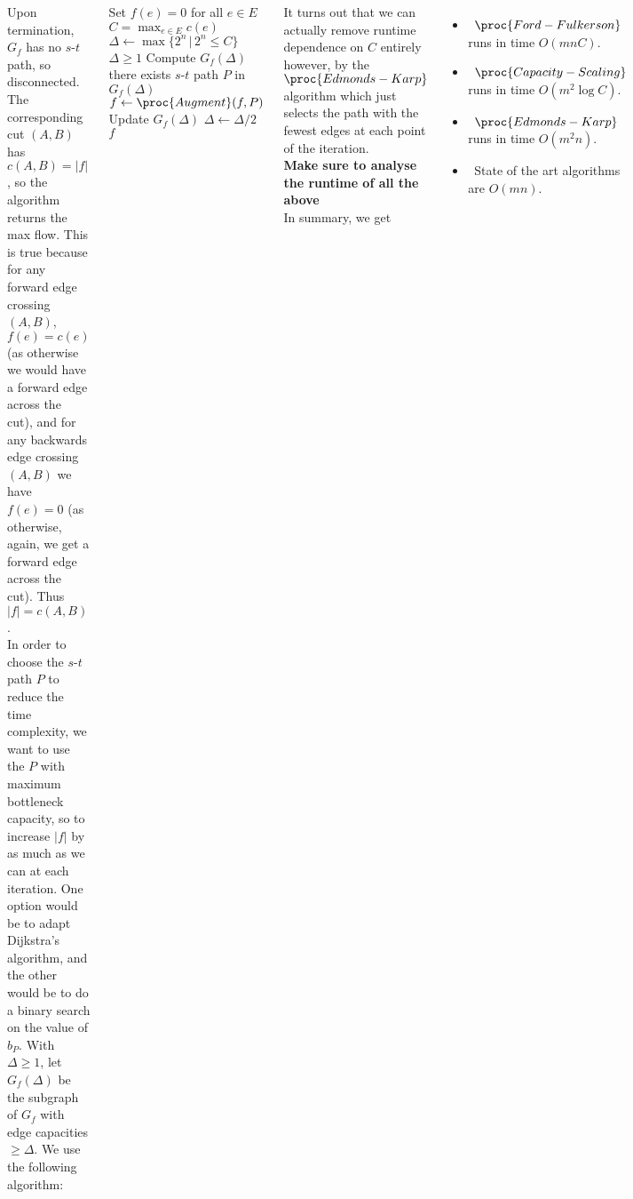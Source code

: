 \documentclass{tikzposter} %
\begin{document}
\begin{columns}
{  Upon termination, $G_{f}$ has no $s$-$t$ path, so disconnected. The corresponding cut $(A,B)$ has $c(A, B) = |f|$, so the algorithm returns the max flow. This is true because for any forward edge crossing $(A,B)$, $f(e) = c(e)$ (as otherwise we would have a forward edge across the cut), and for any backwards edge crossing $(A,B)$ we have $f(e) = 0$ (as otherwise, again, we get a forward edge across the cut). Thus $|f| = c(A,B)$.\\

  In order to choose the $s$-$t$ path $P$ to reduce the time complexity, we want to use the $P$ with maximum bottleneck capacity, so to increase $|f|$ by as much as we can at each iteration. One option would be to adapt Dijkstra's algorithm, and the other would be to do a binary search on the value of $b_{P}$. With $\Delta \ge 1$, let $G_{f}(\Delta)$ be the subgraph of $G_{f}$ with edge capacities $\ge \Delta$. We use the following algorithm:

  \begin{codebox}
  \li Set $f(e) = 0$ for all $e \in E$
  \li $C = \max_{e \in E} c(e)$
  \li $\Delta \gets \max \{2^{n} \,|\, 2^{n} \le C\}$
  \li \While $\Delta \ge 1$ \Do
  \li     Compute $G_{f}(\Delta)$
  \li     \While there exists $s$-$t$ path $P$ in $G_{f}(\Delta)$ \Do
  \li         $f \gets \proc{Augment}(f, P)$
  \li         Update $G_{f}(\Delta)$
          \End
  \li     $\Delta \gets \Delta / 2$
      \End
  \li \Return $f$
  \end{codebox}

  It turns out that we can actually remove runtime dependence on $C$ entirely however, by the $\proc{Edmonds-Karp}$ algorithm which just selects the path with the fewest edges at each point of the iteration.  \\

  \textbf{Make sure to analyse the runtime of all the above} \\

  In summary, we get
  \begin{itemize}
          \item \ $\proc{Ford-Fulkerson}$ runs in time $O(mnC)$.
          \item \ $\proc{Capacity-Scaling}$ runs in time $O(m^{2}\log C)$.
          \item \ $\proc{Edmonds-Karp}$ runs in time $O(m^{2}n)$.
          \item \ State of the art algorithms are $O(mn)$.
  \end{itemize}

}
\end{columns}
\end{document}
